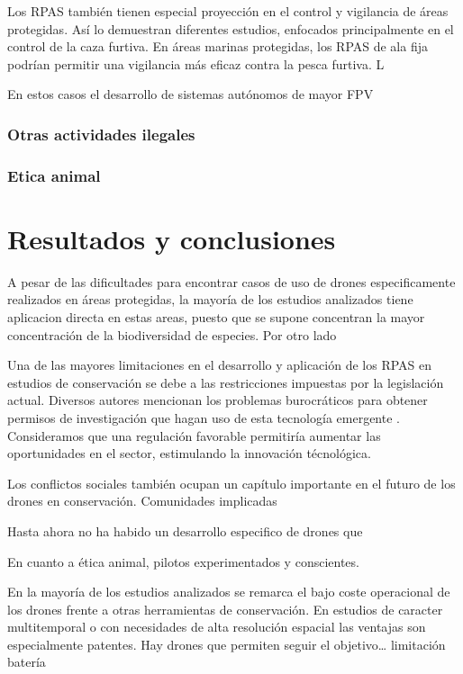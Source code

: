 \documentclass[11pt,]{article}
\begin{document}
Los RPAS también tienen especial proyección en el control y vigilancia
de áreas protegidas. Así lo demuestran diferentes estudios, enfocados
principalmente en el control de la caza furtiva. En áreas marinas
protegidas, los RPAS de ala fija podrían permitir una vigilancia más
eficaz contra la pesca furtiva. L

En estos casos el desarrollo de sistemas autónomos de mayor FPV

\subsubsection{Otras actividades
ilegales}\label{otras-actividades-ilegales}

\subsubsection{Etica animal}\label{etica-animal}

\citep{Ditmer2015}

\section{Resultados y conclusiones}\label{resultados-y-conclusiones}

A pesar de las dificultades para encontrar casos de uso de drones
especificamente realizados en áreas protegidas, la mayoría de los
estudios analizados tiene aplicacion directa en estas areas, puesto que
se supone concentran la mayor concentración de la biodiversidad de
especies. Por otro lado

Una de las mayores limitaciones en el desarrollo y aplicación de los
RPAS en estudios de conservación se debe a las restricciones impuestas
por la legislación actual. Diversos autores mencionan los problemas
burocráticos para obtener permisos de investigación que hagan uso de
esta tecnología emergente \citep{FEE:FEE201513274}. Consideramos que una
regulación favorable permitiría aumentar las oportunidades en el sector,
estimulando la innovación técnológica.

Los conflictos sociales también ocupan un capítulo importante en el
futuro de los drones en conservación. Comunidades implicadas

Hasta ahora no ha habido un desarrollo especifico de drones que

En cuanto a ética animal, pilotos experimentados y conscientes.

En la mayoría de los estudios analizados se remarca el bajo coste
operacional de los drones frente a otras herramientas de conservación.
En estudios de caracter multitemporal o con necesidades de alta
resolución espacial las ventajas son especialmente patentes. Hay drones
que permiten seguir el objetivo\ldots{} limitación batería
\end{document}
